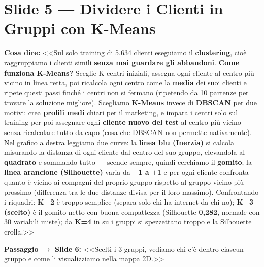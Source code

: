 \documentclass[10pt, a4paper]{article}
\newcommand{\say}[1]{%
  \par\vspace{2pt}\noindent\colorbox{SoftBox}{\parbox{\dimexpr\linewidth-2\fboxsep}{\raggedright\small\textbf{\color{PrimaryNavy}Cosa dire:} #1}}\par\vspace{2pt}%
}
\newcommand{\pass}[2]{%
  \par\vspace{1pt}\noindent\colorbox{PassBox}{\parbox{\dimexpr\linewidth-2\fboxsep}{\raggedright\footnotesize\textbf{\color{AccentAmber}Passaggio $\rightarrow$ Slide #1:} <<#2>>}}\par%
}
\newcommand{\slideblock}[3]{%
  \noindent\begin{minipage}{\linewidth}
    \section*{#1}
    \say{#2}
    #3
  \end{minipage}\par\vspace{6pt}%
}
\begin{document}
\slideblock{Slide 5 --- Dividere i Clienti in Gruppi con K-Means}{%
<<Sul solo training di 5.634 clienti eseguiamo il \textbf{clustering}, cioè raggruppiamo i clienti simili \textbf{senza mai guardare gli abbandoni}. \textbf{Come funziona K-Means?} Sceglie K centri iniziali, assegna ogni cliente al centro più vicino in linea retta, poi ricalcola ogni centro come la \textbf{media} dei suoi clienti e ripete questi passi finché i centri non si fermano (ripetendo da 10 partenze per trovare la soluzione migliore). Scegliamo \textbf{K-Means} invece di \textbf{DBSCAN} per due motivi: crea \textbf{profili medi} chiari per il marketing, e impara i centri solo sul training per poi assegnare ogni \textbf{cliente nuovo del test} al centro più vicino senza ricalcolare tutto da capo (cosa che DBSCAN non permette nativamente). Nel grafico a destra leggiamo due curve: la \textbf{linea blu (Inerzia)} si calcola misurando la distanza di ogni cliente dal centro del suo gruppo, elevandola al \textbf{quadrato} e sommando tutto --- scende sempre, quindi cerchiamo il \textbf{gomito}; la \textbf{linea arancione (Silhouette)} varia da \textbf{$-$1 a $+$1} e per ogni cliente confronta quanto è vicino ai compagni del proprio gruppo rispetto al gruppo vicino più prossimo (differenza tra le due distanze divisa per il loro massimo). Confrontando i riquadri: \textbf{K=2} è troppo semplice (separa solo chi ha internet da chi no); \textbf{K=3 (scelto)} è il gomito netto con buona compattezza (Silhouette \textbf{0,282}, normale con 30 variabili miste); da \textbf{K=4} in su i gruppi si spezzettano troppo e la Silhouette crolla.>>%
}{\pass{6}{Scelti i 3 gruppi, vediamo chi c'è dentro ciascun gruppo e come li visualizziamo nella mappa 2D.}}
\end{document}
